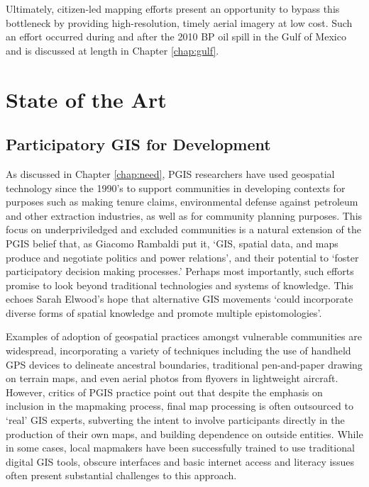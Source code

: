 \documentclass[11pt,oneside,notitlepage]{report}
\begin{document}
{{Ultimately, citizen-led mapping efforts present an opportunity to bypass this bottleneck by providing high-resolution, timely aerial imagery at low cost. Such an effort occurred during and after the 2010 BP oil spill in the Gulf of Mexico and is discussed at length in Chapter \ref{chap:gulf}. 

\chapter{State of the Art}

\section{Participatory GIS for Development}
\label{subsec:pgis}

As discussed in Chapter \ref{chap:need}, \ac{PGIS} researchers have used geospatial technology since the 1990's to support communities in developing contexts for purposes such as making tenure claims, environmental defense against petroleum and other extraction industries, as well as for community planning purposes. This focus on underpriviledged and excluded communities is a natural extension of the \ac{PGIS} belief that, as Giacomo Rambaldi put it, `GIS, spatial data, and maps produce and negotiate politics and power relations', and their potential to `foster participatory decision making processes.' \cite{rambaldi2006participatory}\cite{osha2006participatory} Perhaps most importantly, such efforts promise to look beyond traditional technologies and systems of knowledge. This echoes Sarah Elwood's hope that alternative GIS movements `could incorporate diverse forms of spatial knowledge and promote multiple epistomologies'. \cite{elwood2009representations} 

\label{subsec:pgisshortcomings}

Examples of adoption of geospatial practices amongst vulnerable communities are widespread, incorporating a variety of techniques including the use of handheld GPS devices to delineate ancestral boundaries, traditional pen-and-paper drawing on terrain maps, and even aerial photos from flyovers in lightweight aircraft. However, critics of \ac{PGIS} practice point out that despite the emphasis on inclusion in the mapmaking process, final map processing is often outsourced to `real' GIS experts, subverting the intent to involve participants directly in the production of their own maps, and building dependence on outside entities. While in some cases, local mapmakers have been successfully trained to use traditional digital GIS tools, obscure interfaces and basic internet access and literacy issues often present substantial challenges to this approach. \cite{poole2006there} 

}}
\end{document}
